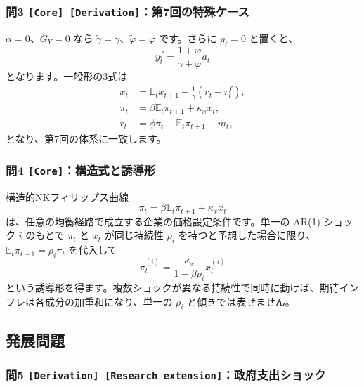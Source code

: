 \documentclass[
  japanese,
  lualatex,
  ja=standard,
  11pt,
  a4paper]{ltjsarticle}
\begin{document}
\subsubsection{\texorpdfstring{問3
\texttt{{[}Core{]}\ {[}Derivation{]}}：第7回の特殊ケース}{問3 {[}Core{]} {[}Derivation{]}：第7回の特殊ケース}}\label{ux554f3-core-derivationux7b2c7ux56deux306eux7279ux6b8aux30b1ux30fcux30b9}

\(\alpha=0\)、\(G_Y=0\) なら
\(\widetilde\gamma=\gamma\)、\(\widetilde\varphi=\varphi\) です。さらに
\(g_t=0\) と置くと、 \[
y_t^f=\frac{1+\varphi}{\gamma+\varphi}a_t
\] となります。一般形の3式は \[
\begin{aligned}
x_t&=\mathbb E_tx_{t+1}-\frac1\gamma(r_t-r_t^f),\\
\pi_t&=\beta\mathbb E_t\pi_{t+1}+\kappa_xx_t,\\
r_t&=\phi\pi_t-\mathbb E_t\pi_{t+1}-m_t,
\end{aligned}
\] となり、第7回の体系に一致します。

\subsubsection{\texorpdfstring{問4
\texttt{{[}Core{]}}：構造式と誘導形}{問4 {[}Core{]}：構造式と誘導形}}\label{ux554f4-coreux69cbux9020ux5f0fux3068ux8a98ux5c0eux5f62}

構造的NKフィリップス曲線 \[
\pi_t=\beta\mathbb E_t\pi_{t+1}+\kappa_xx_t
\] は、任意の均衡経路で成立する企業の価格設定条件です。単一の AR(1)
ショック \(i\) のもとで \(\pi_t\) と \(x_t\) が同じ持続性 \(\rho_i\)
を持つと予想した場合に限り、\(\mathbb E_t\pi_{t+1}=\rho_i\pi_t\)
を代入して \[
\pi_t^{(i)}=\frac{\kappa_x}{1-\beta\rho_i}x_t^{(i)}
\]
という誘導形を得ます。複数ショックが異なる持続性で同時に動けば、期待インフレは各成分の加重和になり、単一の
\(\rho_i\) と傾きでは表せません。

\subsection{発展問題}\label{ux767aux5c55ux554fux984c-7}

\subsubsection{\texorpdfstring{問5
\texttt{{[}Derivation{]}\ {[}Research\ extension{]}}：政府支出ショック}{問5 {[}Derivation{]} {[}Research extension{]}：政府支出ショック}}\label{ux554f5-derivation-research-extensionux653fux5e9cux652fux51faux30b7ux30e7ux30c3ux30af}
\end{document}
